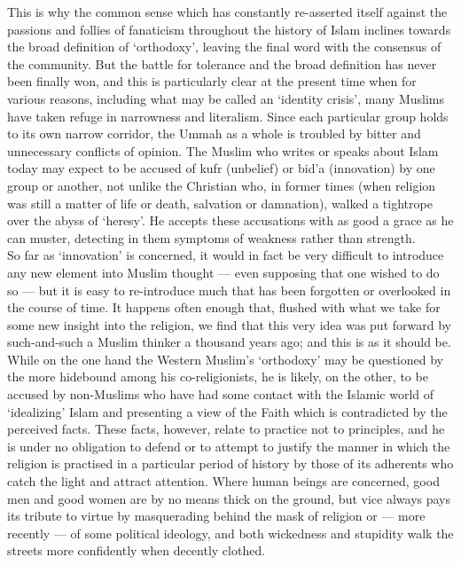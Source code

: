 \documentclass[10pt, twoside,openright]{book}
\begin{document}
This is why the common sense which has constantly re\hyp{}asserted itself against the passions and follies of fanaticism throughout the history of Islam inclines towards the broad definition of `orthodoxy', leaving the final word with the consensus of the community. But the battle for tolerance and the broad definition has never been finally won, and this is particularly clear at the present time when for various reasons, including what may be called an `identity crisis', many Muslims have taken refuge in narrowness and literalism. Since each particular group holds to its own narrow corridor, the Ummah as a whole is troubled by bitter and unnecessary conflicts of opinion. The Muslim who writes or speaks about Islam today may expect to be accused of kufr (unbelief) or bid'a (innovation) by one group or another, not unlike the Christian who, in former times (when religion was still a matter of life or death, salvation or damnation), walked a tightrope over the abyss of `heresy'. He accepts these accusations with as good a grace as he can muster, detecting in them symptoms of weakness rather than strength. \\

So far as `innovation' is concerned, it would in fact be very difficult to introduce any new element into Muslim thought --- even supposing that one wished to do so --- but it is easy to re\hyp{}introduce much that has been forgotten or overlooked in the course of time. It happens often enough that, flushed with what we take for some new insight into the religion, we find that this very idea was put forward by such\hyp{}and\hyp{}such a Muslim thinker a thousand years ago; and this is as it should be. \\

While on the one hand the Western Muslim's `orthodoxy' may be questioned by the more hidebound among his co\hyp{}religionists, he is likely, on the other, to be accused by non\hyp{}Muslims who have had some contact with the Islamic world of `idealizing' Islam and presenting a view of the Faith which is contradicted by the perceived facts. These facts, however, relate to practice not to principles, and he is under no obligation to defend or to attempt to justify the manner in which the religion is practised in a particular period of history by those of its adherents who catch the light and attract attention. Where human beings are concerned, good men and good women are by no means thick on the ground, but vice always pays its tribute to virtue by masquerading behind the mask of religion or --- more recently --- of some political ideology, and both wickedness and stupidity walk the streets more confidently when decently clothed. \\
\end{document}
